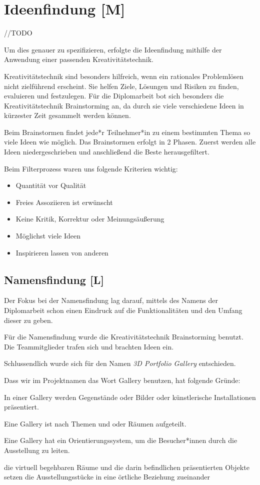 
\section{Ideenfindung [M]}

//TODO

Um dies genauer zu spezifizieren, erfolgte die Ideenfindung mithilfe der Anwendung einer passenden Kreativitätstechnik.

Kreativitätstechnik sind besonders hilfreich, wenn ein rationales Problemlösen nicht zielführend erscheint. Sie helfen Ziele, Lösungen und Risiken zu finden, evaluieren und festzulegen. Für die Diplomarbeit bot sich besonders die Kreativitätstechnik Brainstorming an, da durch sie viele verschiedene Ideen in kürzester Zeit gesammelt werden können. \cite{Ideenfindung}

Beim Brainstormen findet jede*r Teilnehmer*in zu einem bestimmten Thema so viele Ideen wie möglich. Das Brainstormen erfolgt in 2 Phasen. Zuerst werden alle Ideen niedergeschrieben und anschließend die Beste herausgefiltert.  

Beim Filterprozess waren uns folgende Kriterien wichtig:
\begin{itemize}
    \item Quantität vor Qualität
    \item Freies Assoziieren ist erwünscht
    \item Keine Kritik, Korrektur oder Meinungsäußerung
    \item Möglichst viele Ideen
    \item Inspirieren lassen von anderen
\end{itemize}
\cite{Ideenfindung}

\subsection{Namensfindung [L]}
Der Fokus bei der Namensfindung lag darauf, mittels des Namens der Diplomarbeit schon einen Eindruck auf die Funktionalitäten und den Umfang dieser zu geben.

Für die Namensfindung wurde die Kreativitätstechnik Brainstorming benutzt. Die Teammitglieder trafen sich und brachten Ideen ein.

Schlussendlich wurde sich für den Namen \emph{3D Portfolio Gallery} entschieden.

Dass wir im Projektnamen das Wort Gallery benutzen, hat folgende Gründe: 
\begin{compactitem}
    \item In einer Gallery werden Gegenstände oder Bilder oder künstlerische Installationen präsentiert.
    \item Eine Gallery ist nach Themen und oder Räumen aufgeteilt.
    \item Eine Gallery hat ein Orientierungssystem, um die Besucher*innen durch die Ausstellung zu leiten.
    \item die virtuell begehbaren Räume und die darin befindlichen präsentierten Objekte setzen die Ausstellungsstücke in eine örtliche Beziehung zueinander
\end{compactitem}



